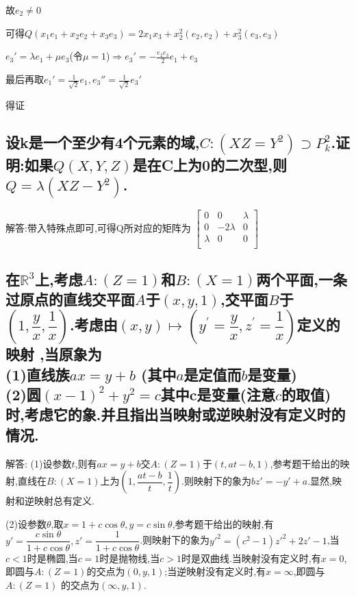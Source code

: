 \documentclass[UTF8]{book}
\begin{document}
				
				故$e_{2}\ne 0$
				
				
				可得$Q(x_{1} e_{1} + x_{2} e_{2}+x_{3} e_{3} )=2 x_{1}x_{3}+x_{2}^{2} (e_{2},e_{2} )+ x_{3}^{2}(e_{3},e_{3} )$
				
				
				$e_{3}'=\lambda e_{1}+\mu e_{3}$(令$\mu=1$)$\Rightarrow e_{3} '=- \frac{e_{2}e_{3}}{2} e_{1}+e_{3}$
				
				
				最后再取$e_{1}'= \frac{1}{\sqrt{2}} e_{1},e_{3} ''= \frac{1}{\sqrt{2}} e_{3}'$
				
				
				得证
		\subsection{设k是一个至少有4个元素的域,$C:(XZ=Y^{2})\supset P^{2}_{k}$.证明:如果$ Q(X,Y,Z) $是在C上为0的二次型,则$ Q=\lambda(XZ-Y^{2}) $.}
			解答:带入特殊点即可,可得Q所对应的矩阵为
			$\begin{bmatrix}
			    0&0&\lambda\\
			    0&-2\lambda&0\\
			    \lambda&0&0\\
			\end{bmatrix}$
		\subsection{在$ \mathbb{R}^{3} $上,考虑$ A:(Z = 1) $和$ B:(X = 1) $两个平面,一条过原点的直线交平面$ A $于$ (x,y,1) $,交平面$ B $于 $ (1,\dfrac{y}{x},\dfrac{1}{x}) $.考虑由$(x, y) \mapsto\left(y^{\prime}=\dfrac{y}{x}, z^{\prime}=\dfrac{1}{x}\right)$定义的映射 ,当原象为\\
		(1)直线族$ ax = y + b $ (其中$ a $是定值而$ b $是变量)\\
		(2)圆$(x-1)^{2}+y^{2}=c$其中c是变量(注意$ c $的取值)\\
		时,考虑它的象.并且指出当映射或逆映射没有定义时的情况.}
		
			解答:
			(1)设参数$ t $,则有$ ax = y + b $交$ A:(Z = 1) $于$ (t,at-b,1) $,参考题干给出的映射,直线在$ B:(X = 1) $上为$ (1,\dfrac{at-b}{t},\dfrac{1}{t}) $.则映射下的象为$ bz' = -y' + a $.显然,映射和逆映射总有定义.
			
			
			(2)设参数$ \theta $,取$ x = 1 + c\cos\theta,y = c\sin\theta $,参考题干给出的映射,有$ y' = \dfrac{c\sin\theta}{1+c\cos\theta},z' = \dfrac{1}{1+c\cos\theta} $.则映射下的象为$ y'^{2} = (c^{2}-1)z'^{2} +2z' -1 $,当$ c<1 $时是椭圆,当$ c = 1 $时是抛物线,当$ c>1 $时是双曲线.当映射没有定义时,有$ x = 0 $,即圆与$ A:(Z = 1) $的交点为$ (0,y,1) $;当逆映射没有定义时,有$ x = \infty $,即圆与$ A:(Z = 1) $ 的交点为$ (\infty,y,1) $.
		
\end{document}

